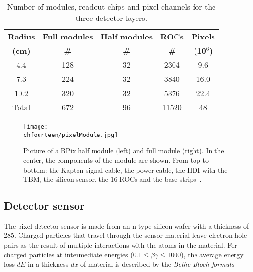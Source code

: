 \begin{table}[!htb]
  \caption{\small Number of modules, readout chips and pixel channels for the three detector layers.}
  \smallskip
  \centering
  \begin{tabular}{|c|c|c|c|c|}
    \hline
    {\bfseries Radius} & {\bfseries Full modules} & {\bfseries Half modules} & {\bfseries ROCs}  & {\bfseries Pixels}  \\
    {\bfseries (cm)}   & {\bfseries \#          } & {\bfseries \#          } & {\bfseries \#  }  & {\bfseries (10$^6$)}\\ \hline \hline
    4.4                & 128                      & 32                       & 2304              & 9.6     \\
    7.3                & 224                      & 32                       & 3840              & 16.0      \\ 
    10.2               & 320                      & 32                       & 5376              & 22.4    \\
    Total              & 672                      & 96                       & 11520             & 48      \\ \hline
  \end{tabular}
  \label{tab:Nmodules}
\end{table}

\begin{figure}[!htb]
 \begin{center}
 \texttt{[image: \\chfourteen/pixelModule.jpg]}
 \end{center}
 \caption{Picture of a BPix half module (left) and full module (right). In the center, the components of the module are shown. From top to bottom: the Kapton signal cable, the power cable, the HDI with the TBM, the silicon sensor, the 16 ROCs and the base strips~\cite{Konig200662}.}
 \label{fig:BpixMod}
\end{figure}

\subsection{Detector sensor}

The pixel detector sensor is made from an n-type silicon wafer with a thickness of 285\mum.
Charged particles that travel through the sensor material leave electron-hole pairs as the result of multiple interactions with the atoms in the material.
For charged particles at intermediate energies ($0.1 \leq \beta\gamma \leq 1000$), the average energy loss $dE$ in a thickness $dx$ of material is described by the \textit{Bethe-Bloch formula}

